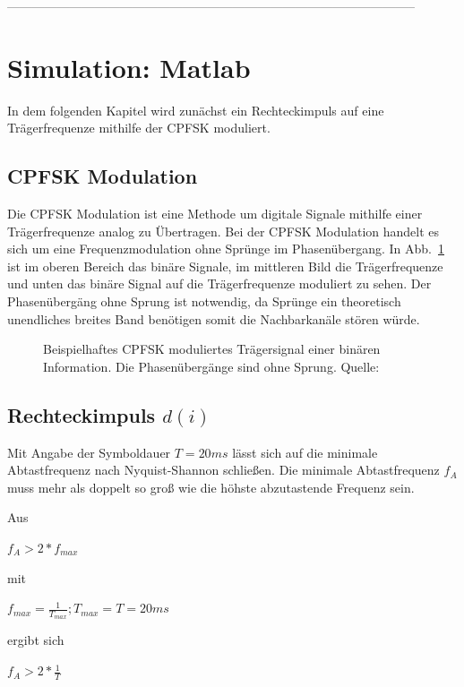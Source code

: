 \documentclass{article}
\begin{document}
--------------------------------------------------------------------------------------------------

\section{Simulation: Matlab}
In dem folgenden Kapitel wird zunächst ein Rechteckimpuls auf eine Trägerfrequenze mithilfe der \ac{CPFSK} moduliert.


\subsection{CPFSK Modulation}
Die \ac{CPFSK} Modulation ist eine Methode um digitale Signale mithilfe einer Trägerfrequenze analog zu Übertragen.
Bei der \ac{CPFSK} Modulation handelt es sich um eine Frequenzmodulation ohne Sprünge im Phasenübergang. In Abb.~\ref{fsk}
ist im oberen Bereich das binäre Signale, im mittleren Bild die Trägerfrequenze und unten das binäre Signal auf die Trägerfrequenze
moduliert zu sehen. Der Phasenübergäng ohne Sprung ist notwendig, da Sprünge ein theoretisch unendliches breites Band benötigen
somit die Nachbarkanäle stören würde.
\begin{figure}[!h]
    \centering
    \def\svgscale{0.3}
    \def\svgwidth{\columnwidth}
    
    \caption{Beispielhaftes \ac{CPFSK} moduliertes Trägersignal einer binären 
    Information. Die Phasenübergänge sind ohne Sprung. Quelle:~\cite{wiki:fsk}}
    \label{fsk}
\end{figure}
\subsection{Rechteckimpuls $d(i)$}\label{sec:rechteck}
Mit Angabe der Symboldauer $T = 20ms$ lässt sich auf die minimale Abtastfrequenz nach Nyquist-Shannon schließen.
Die minimale Abtastfrequenz $f_A$ muss mehr als doppelt so groß wie die höhste abzutastende Frequenz sein.

Aus
\begin{center}
 $
f_A > 2*f_{max}
$
\end{center}

mit 
\begin{center} $f_{max} = \frac{1}{T_{max}} ; T_{max} = T = 20ms$  \end{center}

ergibt sich

\begin{center}
$
f_A > 2*\frac{1}{T}
$
\end{center}
\end{document}
